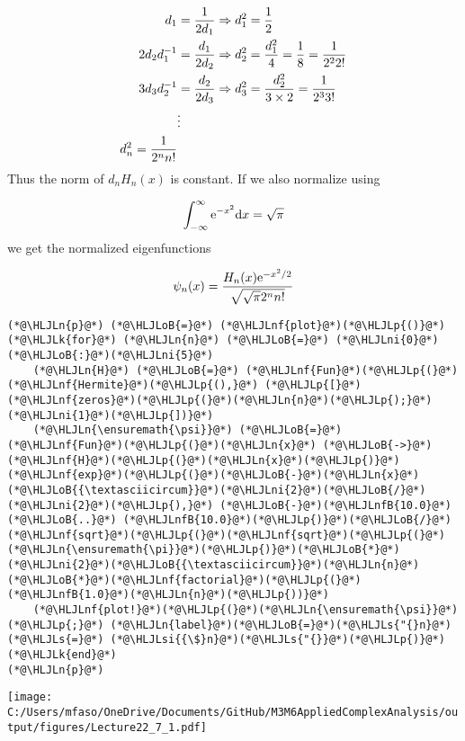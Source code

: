 \documentclass[12pt,landscape]{article}
\newcommand{\HLJLk}[1]{\textcolor[RGB]{148,91,176}{\textbf{#1}}}
\newcommand{\HLJLn}[1]{#1}
\newcommand{\HLJLnf}[1]{\textcolor[RGB]{66,102,213}{#1}}
\newcommand{\HLJLs}[1]{\textcolor[RGB]{201,61,57}{#1}}
\newcommand{\HLJLsi}[1]{#1}
\newcommand{\HLJLnfB}[1]{\textcolor[RGB]{59,151,46}{#1}}
\newcommand{\HLJLni}[1]{\textcolor[RGB]{59,151,46}{#1}}
\newcommand{\HLJLoB}[1]{\textcolor[RGB]{102,102,102}{\textbf{#1}}}
\newcommand{\HLJLp}[1]{#1}
\def\D{ {\rm d} }
\def\E{ {\rm e} }
\def\dx{\D x}
\def\cent#1{\begin{center}#1\end{center} }
\begin{document}
{\begin{align*}
d_1 &= {1 \over 2 d_1} \Rightarrow d_1^2 = {1 \over 2} \\
2d_2d_1^{-1} &= {d_1 \over 2 d_2} \Rightarrow d_2^2 = {d_1^2 \over 4} = {1 \over 8} = {1 \over 2^2 2!} \\
3d_3d_2^{-1} &= {d_2 \over 2 d_3} \Rightarrow d_3^2 = {d_2^2 \over 3\times 2} = {1 \over 2^3 3!} \\
&\vdots \\
d_n^2 = {1 \over 2^n n!}
\end{align*}
Thus the norm of $d_n H_n(x)$ is constant. If we also normalize using

\[
    \int_{-\infty}^\infty \E^{-x^2} \dx = \sqrt{\pi}
\]
we get the normalized eigenfunctions

\[
    \psi_n(x) = {H_n(x)\E^{-x^2/2}  \over \sqrt{\sqrt{\pi} 2^n n!} }
\]

\begin{lstlisting}
(*@\HLJLn{p}@*) (*@\HLJLoB{=}@*) (*@\HLJLnf{plot}@*)(*@\HLJLp{()}@*)
(*@\HLJLk{for}@*) (*@\HLJLn{n}@*) (*@\HLJLoB{=}@*) (*@\HLJLni{0}@*)(*@\HLJLoB{:}@*)(*@\HLJLni{5}@*)
    (*@\HLJLn{H}@*) (*@\HLJLoB{=}@*) (*@\HLJLnf{Fun}@*)(*@\HLJLp{(}@*)(*@\HLJLnf{Hermite}@*)(*@\HLJLp{(),}@*) (*@\HLJLp{[}@*)(*@\HLJLnf{zeros}@*)(*@\HLJLp{(}@*)(*@\HLJLn{n}@*)(*@\HLJLp{);}@*)(*@\HLJLni{1}@*)(*@\HLJLp{])}@*)
    (*@\HLJLn{\ensuremath{\psi}}@*) (*@\HLJLoB{=}@*) (*@\HLJLnf{Fun}@*)(*@\HLJLp{(}@*)(*@\HLJLn{x}@*) (*@\HLJLoB{->}@*) (*@\HLJLnf{H}@*)(*@\HLJLp{(}@*)(*@\HLJLn{x}@*)(*@\HLJLp{)}@*)(*@\HLJLnf{exp}@*)(*@\HLJLp{(}@*)(*@\HLJLoB{-}@*)(*@\HLJLn{x}@*)(*@\HLJLoB{{\textasciicircum}}@*)(*@\HLJLni{2}@*)(*@\HLJLoB{/}@*)(*@\HLJLni{2}@*)(*@\HLJLp{),}@*) (*@\HLJLoB{-}@*)(*@\HLJLnfB{10.0}@*) (*@\HLJLoB{..}@*) (*@\HLJLnfB{10.0}@*)(*@\HLJLp{)}@*)(*@\HLJLoB{/}@*)(*@\HLJLnf{sqrt}@*)(*@\HLJLp{(}@*)(*@\HLJLnf{sqrt}@*)(*@\HLJLp{(}@*)(*@\HLJLn{\ensuremath{\pi}}@*)(*@\HLJLp{)}@*)(*@\HLJLoB{*}@*)(*@\HLJLni{2}@*)(*@\HLJLoB{{\textasciicircum}}@*)(*@\HLJLn{n}@*)(*@\HLJLoB{*}@*)(*@\HLJLnf{factorial}@*)(*@\HLJLp{(}@*)(*@\HLJLnfB{1.0}@*)(*@\HLJLn{n}@*)(*@\HLJLp{))}@*)
    (*@\HLJLnf{plot!}@*)(*@\HLJLp{(}@*)(*@\HLJLn{\ensuremath{\psi}}@*)(*@\HLJLp{;}@*) (*@\HLJLn{label}@*)(*@\HLJLoB{=}@*)(*@\HLJLs{"{}n}@*) (*@\HLJLs{=}@*) (*@\HLJLsi{{\$}n}@*)(*@\HLJLs{"{}}@*)(*@\HLJLp{)}@*)
(*@\HLJLk{end}@*)
(*@\HLJLn{p}@*)
\end{lstlisting}

\cent{\texttt{[image: C:/Users/mfaso/OneDrive/Documents/GitHub/M3M6AppliedComplexAnalysis/output/figures/Lecture22\_7\_1.pdf]}}

}
\end{document}

